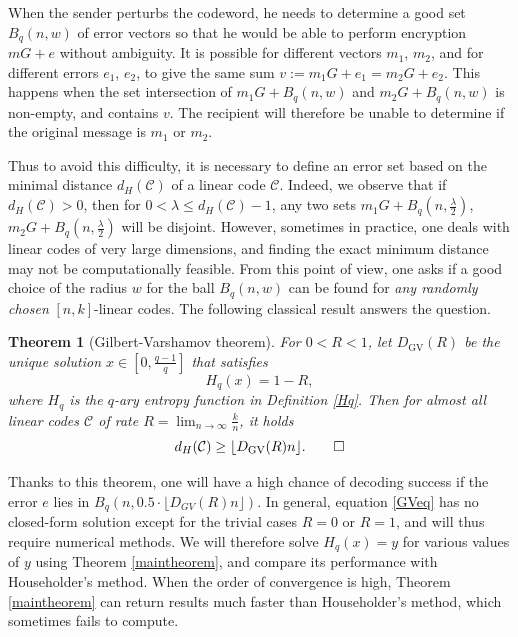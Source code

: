 \documentclass{article}
\newtheorem{theorem}{Theorem}%
\begin{document}
When the sender perturbs the codeword, he needs to determine a good set $B_{q}(n,w)$ of  error  vectors so that he would be able to perform encryption  $mG+e$ without ambiguity. It is possible for different vectors $m_{1}$, $m_{2}$, and for different errors  $e_{1}$, $e_{2}$, to give the same sum $v:=m_{1}G+e_{1}=m_{2}G+e_{2}$. This happens when the set intersection of $m_{1}G+B_{q}(n,w)$ and $m_{2}G+B_{q}(n,w)$ is non-empty, and contains $v$. The recipient will therefore be unable to determine if the original message is $m_{1}$ or $m_{2}$. 


Thus to avoid this difficulty, it is necessary to define an error set based on the minimal distance $d_{H}(\mathcal{C})$ of a linear code $\mathcal{C}$. Indeed, we observe that if $d_{H}(\mathcal{C})>0$, then for $0<\lambda\leqslant d_{H}(\mathcal{C})-1$, any two sets $m_{1}G+B_{q}(n,\frac{\lambda}{2})$,  $m_{2}G+B_{q}(n,\frac{\lambda}{2})$ will be disjoint. However, sometimes in practice, one deals with linear codes of very large dimensions, and finding the exact minimum distance may not be computationally feasible. From this point of view, one asks if a good choice of the radius $w$ for the ball $B_{q}(n,w)$ can be found for \textit{any randomly chosen} $[n,k]$-linear codes. The following classical result answers the question.

\medskip
\begin{theorem}[Gilbert-Varshamov theorem]\label{GV}
	For $0<R<1$, let $D_{\text{GV}}(R)$ be the unique solution $x\in [0,\frac{q-1}{q}]$ that satisfies
	\begin{equation}\label{GVeq}
	H_{q}(x)=1-R,
	\end{equation}
	where $H_{q}$ is the $q$-ary entropy function in Definition \ref{Hq}. Then for almost all linear codes $\mathcal{C}$ of rate $R=\lim_{n\rightarrow \infty}\frac{k}{n}$, it holds
	\[
	d_{H}(\mathcal{C})\geq \lfloor D_{\text{GV}}(R)n\rfloor.\qed
	\]
\end{theorem}
Thanks to this theorem, one will have a high chance of decoding success if the error $e$ lies in $B_{q}(n,0.5\cdot\lfloor  D_{GV}(R)n\rfloor)$. In general, equation \eqref{GVeq} has no closed-form solution except for the trivial cases $R=0$ or $R=1$, and will thus  require numerical methods. We will therefore solve $H_{q}(x)=y$ for various values of $y$ using  Theorem \ref{maintheorem}, and compare its performance with Householder's method. When the order of convergence is high, Theorem \ref{maintheorem} can return results much faster than Householder's method, which sometimes fails to compute. 
\end{document}
